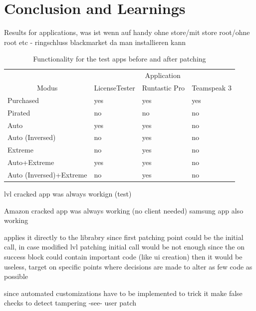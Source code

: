 \section{Conclusion and Learnings} \label{section:luckypatcher-learnings}


Results for applications, was ist wenn auf handy ohne store/mit store root/ohne root etc - ringschluss blackmarket da man installieren kann


\begin{table}[h]
\centering
\begin{tabular}{llll}
                                             & \multicolumn{3}{c}{Application}             \\
\multicolumn{1}{c|}{Modus}                   & LicenseTester & Runtastic Pro & Teamspeak 3 \\ \hline
\multicolumn{1}{l|}{Purchased}               & yes           & yes           & yes         \\
\multicolumn{1}{l|}{Pirated}                 & no            & no            & no          \\
\multicolumn{1}{l|}{Auto}                    & yes           & yes           & no          \\
\multicolumn{1}{l|}{Auto (Inversed)}         & no            & yes           & no          \\
\multicolumn{1}{l|}{Extreme}                 & no            & yes           & no          \\
\multicolumn{1}{l|}{Auto+Extreme}            & yes           & yes           & no          \\
\multicolumn{1}{l|}{Auto (Inversed)+Extreme} & no            & yes           & no
\end{tabular}
\caption{Functionality for the test apps before and after patching}
\label{table:functionality}
\end{table}

lvl cracked app was always workign (test)

Amazon cracked app was always working (no client needed)
samsung app also working

applies it directly to the librabry since first patching point could be the initial call, in case modified lvl patching initial call would be not enough since the on success block could contain important code (like ui creation) then it would be useless, target on specific points where decisions are made to alter as few code as possible

since automated customizations have to be implemented to trick it
make false checks to detect tampering -see- user patch

